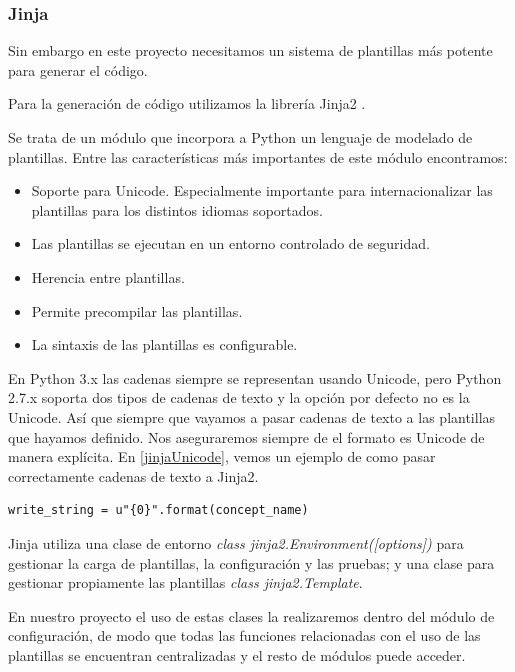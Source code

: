 \subsubsection{Jinja}\label{sec:jinja}
Sin embargo en este proyecto necesitamos un sistema de plantillas más potente para generar el código.\medskip\par
Para la generación de código utilizamos la librería Jinja2 \cite{jinja}.\par 
Se trata de un módulo que incorpora a Python un lenguaje de modelado de plantillas. Entre las características más importantes de este módulo encontramos:
\begin{itemize}
\item Soporte para Unicode. Especialmente importante para internacionalizar las plantillas para los distintos idiomas soportados.
\item Las plantillas se ejecutan en un entorno controlado de seguridad.
\item Herencia entre plantillas.
\item Permite precompilar las plantillas. 
\item La sintaxis de las plantillas es configurable.  
\end{itemize}

En Python 3.x las cadenas siempre se representan usando Unicode, pero  Python 2.7.x soporta dos tipos de cadenas de texto y la opción por defecto no es la Unicode. Así que siempre que vayamos a pasar cadenas de texto a las plantillas que hayamos definido. Nos aseguraremos siempre de el formato es Unicode de manera explícita. En \ref{jinjaUnicode}, vemos un ejemplo de como pasar correctamente cadenas de texto a Jinja2.\par


\begin{lstlisting}[label=jinjaUnicode,caption=Cadena de texto Unicode para Jinja2]
    write_string = u"{0}".format(concept_name)
\end{lstlisting}

Jinja utiliza una clase de entorno \emph{class jinja2.Environment([options])} para gestionar la carga de plantillas, la configuración y las pruebas; y una clase para gestionar propiamente las plantillas \emph{class jinja2.Template}.\par 
En nuestro proyecto el uso de estas clases la realizaremos dentro del módulo de configuración, de modo que todas las funciones relacionadas con el uso de las plantillas se encuentran centralizadas y el resto de módulos puede acceder.\medskip\par 

